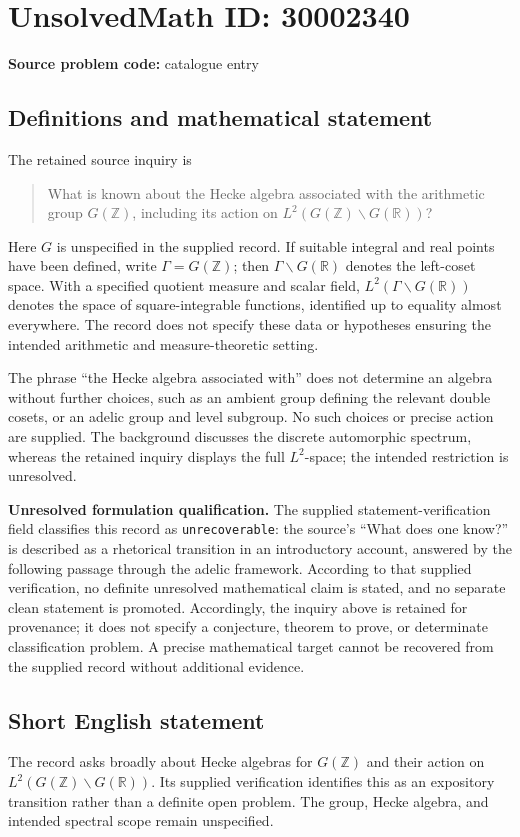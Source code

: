 \documentclass[11pt]{article}
\newcommand{\Z}{\mathbb{Z}}
\newcommand{\R}{\mathbb{R}}
\begin{document}
\section*{UnsolvedMath ID: 30002340}
\textbf{Source problem code:} catalogue entry
\subsection{Definitions and mathematical statement}
The retained source inquiry is
\begin{quote}
What is known about the Hecke algebra associated with the arithmetic group \(G(\Z)\), including its action on \(L^2(G(\Z)\backslash G(\R))\)?
\end{quote}
Here \(G\) is unspecified in the supplied record. If suitable integral and real points have been defined, write \(\Gamma=G(\Z)\); then \(\Gamma\backslash G(\R)\) denotes the left-coset space. With a specified quotient measure and scalar field, \(L^2(\Gamma\backslash G(\R))\) denotes the space of square-integrable functions, identified up to equality almost everywhere. The record does not specify these data or hypotheses ensuring the intended arithmetic and measure-theoretic setting.

The phrase ``the Hecke algebra associated with'' does not determine an algebra without further choices, such as an ambient group defining the relevant double cosets, or an adelic group and level subgroup. No such choices or precise action are supplied. The background discusses the discrete automorphic spectrum, whereas the retained inquiry displays the full \(L^2\)-space; the intended restriction is unresolved.

\textbf{Unresolved formulation qualification.} The supplied statement-verification field classifies this record as \texttt{unrecoverable}: the source's ``What does one know?'' is described as a rhetorical transition in an introductory account, answered by the following passage through the adelic framework. According to that supplied verification, no definite unresolved mathematical claim is stated, and no separate clean statement is promoted. Accordingly, the inquiry above is retained for provenance; it does not specify a conjecture, theorem to prove, or determinate classification problem. A precise mathematical target cannot be recovered from the supplied record without additional evidence.
\subsection{Short English statement}
The record asks broadly about Hecke algebras for \(G(\Z)\) and their action on \(L^2(G(\Z)\backslash G(\R))\). Its supplied verification identifies this as an expository transition rather than a definite open problem. The group, Hecke algebra, and intended spectral scope remain unspecified.
\end{document}
